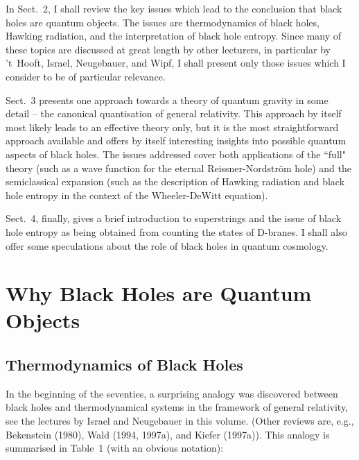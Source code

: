 \documentclass[12pt]{article}
\begin{document}
In Sect.~2, I shall review the key issues which lead to
the conclusion that black holes are quantum objects. The issues are
thermodynamics of black holes, Hawking radiation, and the
interpretation of black hole entropy. Since many of these topics
are discussed at great length by other lecturers, in particular by
't~Hooft, Israel, Neugebauer, and Wipf, I shall present only   
those issues which I consider to be of particular relevance.

Sect.~3 presents one approach towards a theory of quantum
gravity in some detail -- the canonical quantisation of general relativity.
This approach by itself most likely leads to
an effective theory only, but it is
the most straightforward approach available and offers by itself
interesting insights into possible quantum aspects of black holes.
The issues addressed cover both applications of the ``full"
theory (such as a wave function for the eternal Reissner-Nordstr\"om hole)
and the semiclassical expansion
(such as the description of Hawking radiation and black hole entropy in
the context of the Wheeler-DeWitt equation).

Sect.~4, finally, gives a brief introduction to superstrings and the
issue of black hole entropy as being obtained from counting
the states of D-branes. I shall also offer some speculations
about the role of black holes in quantum cosmology. 
  
\section{Why Black Holes are Quantum Objects}

\subsection{Thermodynamics of Black Holes}
In the beginning of the seventies, a surprising analogy
was discovered between black holes and thermodynamical systems
in the framework of general relativity,
see the lectures by Israel and Neugebauer in this volume.
(Other reviews are, e.g., Bekenstein (1980), Wald (1994, 1997a),
and Kiefer (1997a)). This analogy is summarised in
Table~1 (with an obvious notation):
\end{document}
